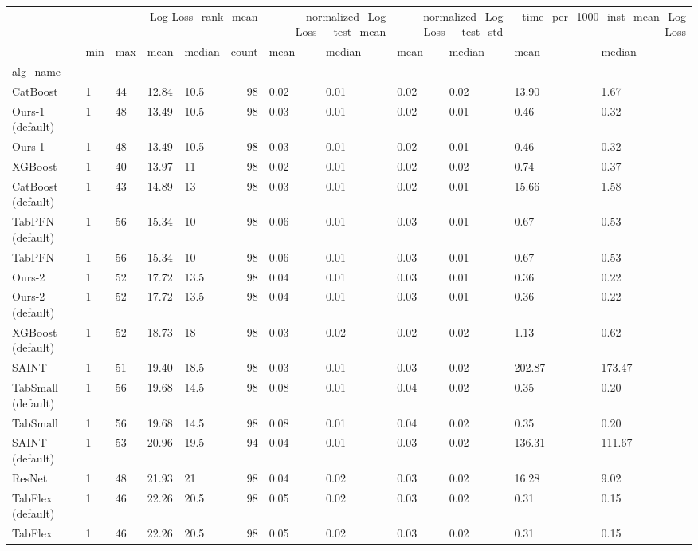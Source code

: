 \begin{tabular}{lllllrllllll}
\toprule
 & \multicolumn{5}{r}{Log Loss_rank_mean} & \multicolumn{2}{r}{normalized_Log Loss__test_mean} & \multicolumn{2}{r}{normalized_Log Loss__test_std} & \multicolumn{2}{r}{time_per_1000_inst_mean_Log Loss} \\
 & min & max & mean & median & count & mean & median & mean & median & mean & median \\
alg_name &  &  &  &  &  &  &  &  &  &  &  \\
\midrule
CatBoost & 1 & 44 & 12.84 & 10.5 & 98 & 0.02 & 0.01 & 0.02 & 0.02 & 13.90 & 1.67 \\
Ours-1 (default) & 1 & 48 & 13.49 & 10.5 & 98 & 0.03 & 0.01 & 0.02 & 0.01 & 0.46 & 0.32 \\
Ours-1 & 1 & 48 & 13.49 & 10.5 & 98 & 0.03 & 0.01 & 0.02 & 0.01 & 0.46 & 0.32 \\
XGBoost & 1 & 40 & 13.97 & 11 & 98 & 0.02 & 0.01 & 0.02 & 0.02 & 0.74 & 0.37 \\
CatBoost (default) & 1 & 43 & 14.89 & 13 & 98 & 0.03 & 0.01 & 0.02 & 0.01 & 15.66 & 1.58 \\
TabPFN (default) & 1 & 56 & 15.34 & 10 & 98 & 0.06 & 0.01 & 0.03 & 0.01 & 0.67 & 0.53 \\
TabPFN & 1 & 56 & 15.34 & 10 & 98 & 0.06 & 0.01 & 0.03 & 0.01 & 0.67 & 0.53 \\
Ours-2 & 1 & 52 & 17.72 & 13.5 & 98 & 0.04 & 0.01 & 0.03 & 0.01 & 0.36 & 0.22 \\
Ours-2 (default) & 1 & 52 & 17.72 & 13.5 & 98 & 0.04 & 0.01 & 0.03 & 0.01 & 0.36 & 0.22 \\
XGBoost (default) & 1 & 52 & 18.73 & 18 & 98 & 0.03 & 0.02 & 0.02 & 0.02 & 1.13 & 0.62 \\
SAINT & 1 & 51 & 19.40 & 18.5 & 98 & 0.03 & 0.01 & 0.03 & 0.02 & 202.87 & 173.47 \\
TabSmall (default) & 1 & 56 & 19.68 & 14.5 & 98 & 0.08 & 0.01 & 0.04 & 0.02 & 0.35 & 0.20 \\
TabSmall & 1 & 56 & 19.68 & 14.5 & 98 & 0.08 & 0.01 & 0.04 & 0.02 & 0.35 & 0.20 \\
SAINT (default) & 1 & 53 & 20.96 & 19.5 & 94 & 0.04 & 0.01 & 0.03 & 0.02 & 136.31 & 111.67 \\
ResNet & 1 & 48 & 21.93 & 21 & 98 & 0.04 & 0.02 & 0.03 & 0.02 & 16.28 & 9.02 \\
TabFlex (default) & 1 & 46 & 22.26 & 20.5 & 98 & 0.05 & 0.02 & 0.03 & 0.02 & 0.31 & 0.15 \\
TabFlex & 1 & 46 & 22.26 & 20.5 & 98 & 0.05 & 0.02 & 0.03 & 0.02 & 0.31 & 0.15 \\

\end{tabular}
